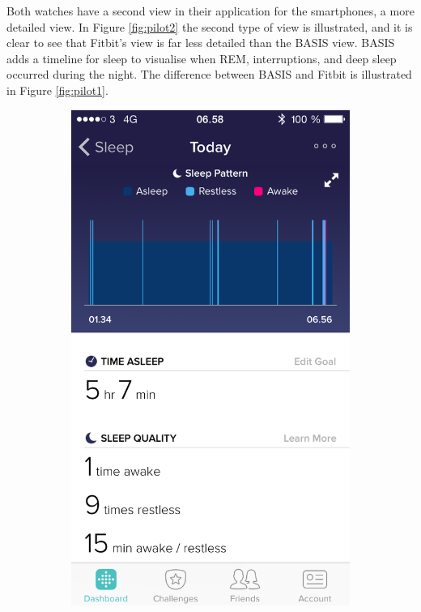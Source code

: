 \documentclass[12pt]{article} %
\begin{document}
Both watches have a second view in their application for the smartphones, a more detailed view. In Figure \ref{fig:pilot2} the second type of view is illustrated, and it is clear to see that Fitbit's view is far less detailed than the BASIS view. BASIS adds a timeline for sleep to visualise when REM, interruptions, and deep sleep occurred during the night. The difference between BASIS and Fitbit is illustrated in Figure \ref{fig:pilot1}.

\begin{figure}[H]
    \centering
    \begin{subfigure}[b]{0.45\textwidth}
        \includegraphics[width=\textwidth]{img/26-10-fitbit}

\end{subfigure}
\end{figure}
\end{document}
